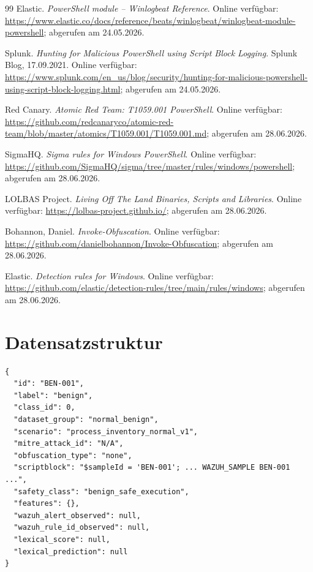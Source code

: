 \documentclass[12pt,a4paper,oneside,parskip=half]{scrreprt}
\begin{document}
\begin{thebibliography}{99}
Elastic. \emph{PowerShell module -- Winlogbeat Reference}. Online verfügbar: \url{https://www.elastic.co/docs/reference/beats/winlogbeat/winlogbeat-module-powershell}; abgerufen am 24.05.2026.

Splunk. \emph{Hunting for Malicious PowerShell using Script Block Logging}. Splunk Blog, 17.09.2021. Online verfügbar: \url{https://www.splunk.com/en_us/blog/security/hunting-for-malicious-powershell-using-script-block-logging.html}; abgerufen am 24.05.2026.

Red Canary. \emph{Atomic Red Team: T1059.001 PowerShell}. Online verfügbar: \url{https://github.com/redcanaryco/atomic-red-team/blob/master/atomics/T1059.001/T1059.001.md}; abgerufen am 28.06.2026.

SigmaHQ. \emph{Sigma rules for Windows PowerShell}. Online verfügbar: \url{https://github.com/SigmaHQ/sigma/tree/master/rules/windows/powershell}; abgerufen am 28.06.2026.

LOLBAS Project. \emph{Living Off The Land Binaries, Scripts and Libraries}. Online verfügbar: \url{https://lolbas-project.github.io/}; abgerufen am 28.06.2026.

Bohannon, Daniel. \emph{Invoke-Obfuscation}. Online verfügbar: \url{https://github.com/danielbohannon/Invoke-Obfuscation}; abgerufen am 28.06.2026.

Elastic. \emph{Detection rules for Windows}. Online verfügbar: \url{https://github.com/elastic/detection-rules/tree/main/rules/windows}; abgerufen am 28.06.2026.

\end{thebibliography}

\appendix

\chapter{Datensatzstruktur}
\begin{lstlisting}[language={},caption={JSON-Schema des finalen Datensatzes in vereinfachter Form}]
{
  "id": "BEN-001",
  "label": "benign",
  "class_id": 0,
  "dataset_group": "normal_benign",
  "scenario": "process_inventory_normal_v1",
  "mitre_attack_id": "N/A",
  "obfuscation_type": "none",
  "scriptblock": "$sampleId = 'BEN-001'; ... WAZUH_SAMPLE BEN-001 ...",
  "safety_class": "benign_safe_execution",
  "features": {},
  "wazuh_alert_observed": null,
  "wazuh_rule_id_observed": null,
  "lexical_score": null,
  "lexical_prediction": null
}
\end{lstlisting}
\end{document}
